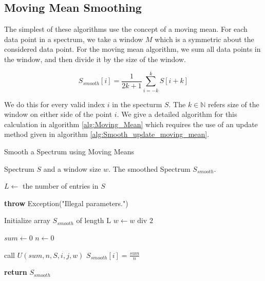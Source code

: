 \documentclass[11pt,openany]{book}
\begin{document}
\subsection{Moving Mean Smoothing}
The simplest of these algorithms use the concept of a moving mean. For each data point in a spectrum, we take a window $M$ which is a symmetric about the considered data point. For the moving mean algorithm, we sum all data points in the window, and then divide it by the size of the window.

\begin{equation}
    S_{smooth}[i] = \frac{1}{2k+1}\sum_{i = -k}^k S[i + k]
\end{equation}

We do this for every valid index $i$ in the specturm $S$. The $k \in \mathbb{N}$ refers size of the window on either side of the point $i$. We give a detailed algorithm for this calculation in algorithm \ref{alg:Moving_Mean} which requires the use of an update method given in algorithm \ref{alg:Smooth_update_moving_mean}.

\begin{algorithm}
    \begin{algorithmic}
        \label{alg:Moving_Mean}
        \caption{Smooth a Spectrum using Moving Means}
        \Require Spectrum $S$ and a window size $w$.
        \Ensure The smoothed Spectrum $S_{smooth}$.
        
            \State $L \gets $ the number of entries in $S$ 
        
               \State \textbf{throw} Exception("Illegal parameters.")
            \EndIf
        
            \State Initialize array $S_{smooth}$ of length L
            \State $w \gets w \text{ div } 2$
        
                \State $sum \gets 0$
                \State $n \gets 0$
                
                    
                        \State call $U(sum, n, S, i, j, w)$     
                    \EndIf
                \EndFor
                \State $S_{smooth}[i] = \frac{sum}{n}$
            \EndFor
            
            \State \textbf{return } $S_{smooth}$ 
        \EndProcedure
    \end{algorithmic}
\end{algorithm}
\end{document}
